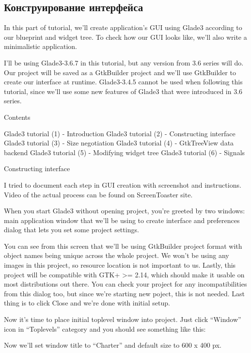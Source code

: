 \documentclass[a4paper,openany,twoside,draft]{book}
\begin{document}
\subsection{Конструирование интерфейса}
\label{sec:gladeint}

In this part of tutorial, we'll create application's GUI using Glade3 according to our blueprint and widget tree. To check how our GUI looks like, we'll also write a minimalistic application.

I'll be using Glade3-3.6.7 in this tutorial, but any version from 3.6 series will do. Our project will be saved as a GtkBuilder project and we'll use GtkBuilder to create our interface at runtime. Glade3-3.4.5 cannot be used when following this tutorial, since we'll use some new features of Glade3 that were introduced in 3.6 series.

Contents

    Glade3 tutorial (1) - Introduction
    Glade3 tutorial (2) - Constructing interface
    Glade3 tutorial (3) - Size negotiation
    Glade3 tutorial (4) - GtkTreeView data backend
    Glade3 tutorial (5) - Modifying widget tree
    Glade3 tutorial (6) - Signals

Constructing interface

I tried to document each step in GUI creation with screenshot and instructions. Video of the actual process can be found on ScreenToaster site.

When you start Glade3 without opening project, you're greeted by two windows: main application window that we'll be using to create interface and preferences dialog that lets you set some project settings.

You can see from this screen that we'll be using GtkBuilder project format with object names being unique across the whole project. We won't be using any images in this project, so resource location is not important to us. Lastly, this project will be compatible with GTK+ >= 2.14, which should make it usable on most distributions out there. You can check your project for any incompatibilities from this dialog too, but since we're starting new poject, this is not needed. Last thing is to click Close and we're done with initial setup.

Now it's time to place initial toplevel window into project. Just click ``Window'' icon in ``Toplevels'' category and you should see something like this:

 Now we'll set window title to ``Charter'' and default size to 600 x 400 px.
\end{document}
